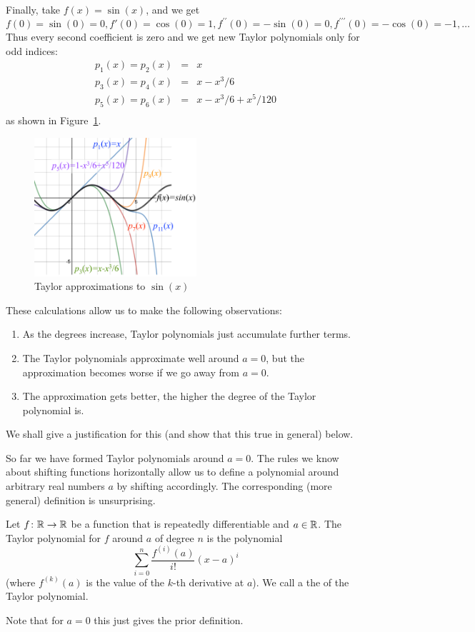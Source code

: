 Finally, take $f(x)=\sin(x)$, and we get
\[
f(0)=\sin(0)=0, f'(0)=\cos(0)=1,
f^{\prime\prime}(0)=-\sin(0)=0,
f^{\prime\prime\prime}(0)=-\cos(0)=-1,\ldots
\]
Thus every second coefficient is zero and we get new Taylor polynomials only
for odd indices:
\begin{eqnarray*}
p_1(x)=p_2(x)&=&x\\
p_3(x)=p_4(x)&=&x-x^3/6\\
p_5(x)=p_6(x)&=&x-x^3/6+x^5/120\\
\end{eqnarray*}
as shown in Figure~\ref{figtaysin}.
\begin{figure}
\begin{center}
\includegraphics[width=6cm]{pic/TaylorSin.pdf}
\end{center}
\caption{Taylor approximations to $\sin(x)$}
\label{figtaysin}
\end{figure}
These calculations allow us to make the following observations:
\begin{enumerate}
\item As the degrees increase, Taylor polynomials just accumulate further
terms.
\item The Taylor polynomials approximate well around $a=0$, but the
approximation becomes worse if we go away from $a=0$.
\item The approximation gets better, the higher the degree of the Taylor
polynomial is.
\end{enumerate}
We shall give a justification for this (and show that this true in general)
below.
\bigskip

So far we have formed Taylor polynomials around $a=0$. The rules we know
about shifting functions horizontally allow us to define a polynomial around
arbitrary real numbers $a$ by shifting accordingly. The corresponding (more
general) definition is unsurprising.
\begin{defn}
Let $f\colon{\mathbb R}\to{\mathbb R}$ be a function that is repeatedly differentiable
and $a\in{\mathbb R}$.
The Taylor polynomial for $f$ around $a$ of degree $n$ is the polynomial
\[
\sum_{i=0}^n\frac{f^{(i)}(a)}{i!} (x-a)^i
\]
(where $f^{(k)}(a)$ is the value of the $k$-th derivative at $a$). We call a
the  of the Taylor polynomial.
\end{defn}
Note that for $a=0$ this just gives the prior definition.

